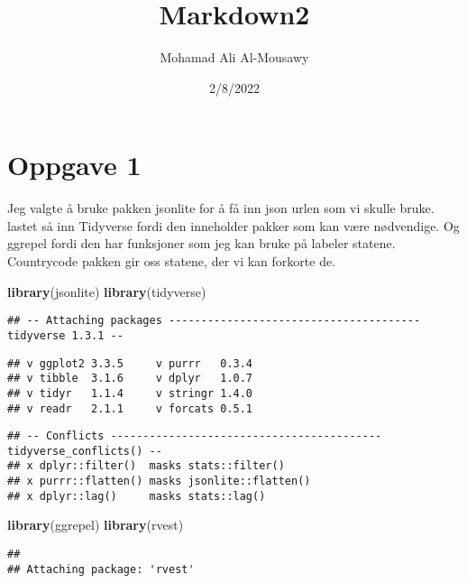 \documentclass[
]{article}
\title{Markdown2}
\author{Mohamad Ali Al-Mousawy}
\date{2/8/2022}
\newenvironment{Shaded}{\begin{snugshade}}{\end{snugshade}}
\newcommand{\KeywordTok}[1]{\textcolor[rgb]{0.13,0.29,0.53}{\textbf{#1}}}
\newcommand{\NormalTok}[1]{#1}
\begin{document}
\maketitle

\hypertarget{oppgave-1}{%
\section{Oppgave 1}\label{oppgave-1}}

Jeg valgte å bruke pakken jsonlite for å få inn json urlen som vi skulle
bruke. lastet så inn Tidyverse fordi den inneholder pakker som kan være
nødvendige. Og ggrepel fordi den har funksjoner som jeg kan bruke på
labeler statene. Countrycode pakken gir oss statene, der vi kan forkorte
de.

\begin{Shaded}
\begin{Highlighting}[]
\KeywordTok{library}\NormalTok{(jsonlite)}
\KeywordTok{library}\NormalTok{(tidyverse)}
\end{Highlighting}
\end{Shaded}

\begin{verbatim}
## -- Attaching packages --------------------------------------- tidyverse 1.3.1 --
\end{verbatim}

\begin{verbatim}
## v ggplot2 3.3.5     v purrr   0.3.4
## v tibble  3.1.6     v dplyr   1.0.7
## v tidyr   1.1.4     v stringr 1.4.0
## v readr   2.1.1     v forcats 0.5.1
\end{verbatim}

\begin{verbatim}
## -- Conflicts ------------------------------------------ tidyverse_conflicts() --
## x dplyr::filter()  masks stats::filter()
## x purrr::flatten() masks jsonlite::flatten()
## x dplyr::lag()     masks stats::lag()
\end{verbatim}

\begin{Shaded}
\begin{Highlighting}[]
\KeywordTok{library}\NormalTok{(ggrepel)}
\KeywordTok{library}\NormalTok{(rvest)}
\end{Highlighting}
\end{Shaded}

\begin{verbatim}
## 
## Attaching package: 'rvest'
\end{verbatim}
\end{document}
